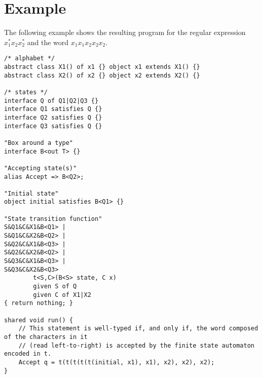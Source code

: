 \documentclass[a4paper, 11pt]{article}
\begin{document}
\section{Example}
The following example shows the resulting program for the regular expression $x_1^\ast x_2 x_2^\ast$ and the word $x_1x_1x_2x_2x_2$.
\begin{verbatim}
/* alphabet */
abstract class X1() of x1 {} object x1 extends X1() {}
abstract class X2() of x2 {} object x2 extends X2() {}

/* states */
interface Q of Q1|Q2|Q3 {}
interface Q1 satisfies Q {}
interface Q2 satisfies Q {}
interface Q3 satisfies Q {}

"Box around a type"
interface B<out T> {}

"Accepting state(s)"
alias Accept => B<Q2>;

"Initial state"
object initial satisfies B<Q1> {}

"State transition function"
S&Q1&C&X1&B<Q1> |
S&Q1&C&X2&B<Q2> |
S&Q2&C&X1&B<Q3> |
S&Q2&C&X2&B<Q2> |
S&Q3&C&X1&B<Q3> |
S&Q3&C&X2&B<Q3>
        t<S,C>(B<S> state, C x)
        given S of Q
        given C of X1|X2
{ return nothing; }

shared void run() {
    // This statement is well-typed if, and only if, the word composed of the characters in it
    // (read left-to-right) is accepted by the finite state automaton encoded in t.
    Accept q = t(t(t(t(t(initial, x1), x1), x2), x2), x2);
}
\end{verbatim}
\end{document}
